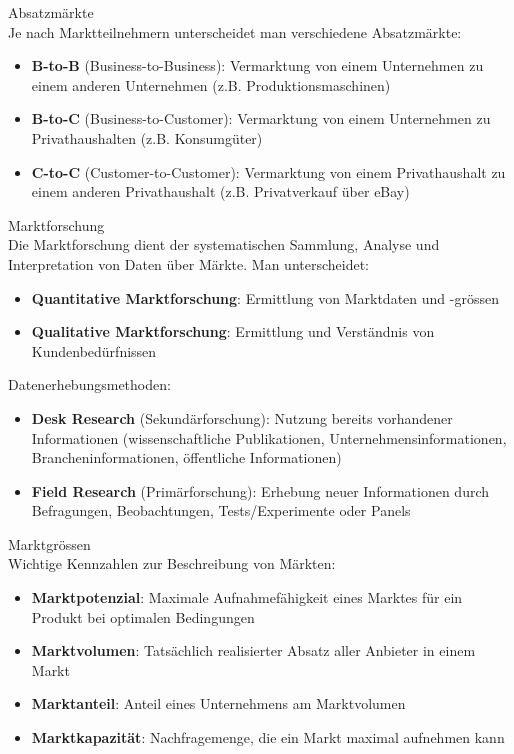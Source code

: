 \begin{definition}{Absatzmärkte}\\
Je nach Marktteilnehmern unterscheidet man verschiedene Absatzmärkte:
\begin{itemize}
    \item \textbf{B-to-B} (Business-to-Business): Vermarktung von einem Unternehmen zu einem anderen Unternehmen (z.B. Produktionsmaschinen)
    \item \textbf{B-to-C} (Business-to-Customer): Vermarktung von einem Unternehmen zu Privathaushalten (z.B. Konsumgüter)
    \item \textbf{C-to-C} (Customer-to-Customer): Vermarktung von einem Privathaushalt zu einem anderen Privathaushalt (z.B. Privatverkauf über eBay)
\end{itemize}
\end{definition}

\begin{definition}{Marktforschung}\\
Die Marktforschung dient der systematischen Sammlung, Analyse und Interpretation von Daten über Märkte. Man unterscheidet:
\begin{itemize}
    \item \textbf{Quantitative Marktforschung}: Ermittlung von Marktdaten und -grössen
    \item \textbf{Qualitative Marktforschung}: Ermittlung und Verständnis von Kundenbedürfnissen
\end{itemize}

Datenerhebungsmethoden:
\begin{itemize}
    \item \textbf{Desk Research} (Sekundärforschung): Nutzung bereits vorhandener Informationen (wissenschaftliche Publikationen, Unternehmensinformationen, Brancheninformationen, öffentliche Informationen)
    \item \textbf{Field Research} (Primärforschung): Erhebung neuer Informationen durch Befragungen, Beobachtungen, Tests/Experimente oder Panels
\end{itemize}
\end{definition}

\begin{definition}{Marktgrössen}\\
Wichtige Kennzahlen zur Beschreibung von Märkten:
\begin{itemize}
    \item \textbf{Marktpotenzial}: Maximale Aufnahmefähigkeit eines Marktes für ein Produkt bei optimalen Bedingungen
    \item \textbf{Marktvolumen}: Tatsächlich realisierter Absatz aller Anbieter in einem Markt
    \item \textbf{Marktanteil}: Anteil eines Unternehmens am Marktvolumen
    \item \textbf{Marktkapazität}: Nachfragemenge, die ein Markt maximal aufnehmen kann
\end{itemize}
\end{definition}

